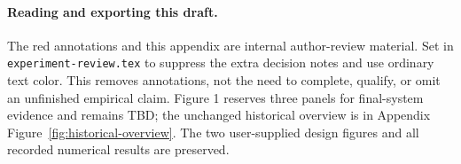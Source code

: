 \paragraph{Reading and exporting this draft.}
The red annotations and this appendix are internal author-review material.
Set \texttt{\string\experimentreviewfalse} in \texttt{experiment-review.tex}
to suppress the extra decision notes and use ordinary text color. This removes
annotations, not the need to complete, qualify, or omit an unfinished empirical
claim. Figure 1 reserves three panels for final-system evidence and remains TBD;
the unchanged historical overview is in Appendix Figure~\ref{fig:historical-overview}.
The two user-supplied design figures and all recorded numerical results are preserved.
\endgroup
